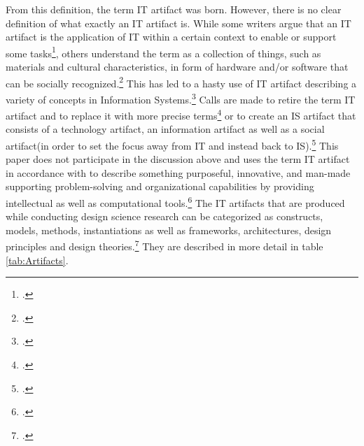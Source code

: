 From this definition, the term IT artifact was born. However, there is no clear definition of what exactly an IT artifact is. While some writers argue that an IT artifact is the application of IT within a certain context to enable or support some tasks\footcites[Cf.][p.186]{BenbasatEmpiricalresearchinformation1999}[cf.][p.50]{AlterconceptITartifact2015}, others understand the term as a collection of things, such as materials and cultural characteristics, in form of hardware and/or software that can be socially recognized.\footcite[Cf.][p.121]{OrlikowskiResearchcommentaryDesperately2001} This has led to a hasty use of IT artifact describing a variety of concepts in Information Systems.\footcite[Cf.][p.49]{AlterconceptITartifact2015} Calls are made to retire the term IT artifact and to replace it with more precise terms\footcite[Cf.][p.59]{AlterconceptITartifact2015} or to create an IS artifact that consists of a technology artifact, an information artifact as well as a social artifact(in order to set the focus away from IT and instead back to IS).\footcite[Cf.][pp.1,6]{LeeGoingbackbasics2015} This paper does not participate in the discussion above and uses the term IT artifact in accordance with \cite{HevnerDesignScienceResearch2004} to describe something purposeful, innovative, and man-made supporting problem-solving and organizational capabilities by providing intellectual as well as computational tools.\footcites[Cf.][pp.76,82]{HevnerDesignScienceResearch2004}[cf.][p.340]{GregorPositioningpresentingdesign2013}
The IT artifacts that are produced while conducting design science research can be categorized as constructs, models, methods, instantiations as well as frameworks, architectures, design principles and design theories.\footcites[Cf.][pp.256-258]{MarchDesignnaturalscience1995}[cf.][p.343]{GregorPositioningpresentingdesign2013} [cf.][p.50]{PuraoDesignResearchTechnology2002} [cf.][p.77]{HevnerDesignResearchInformation2010} They are described in more detail in table \ref{tab:Artifacts}. 

